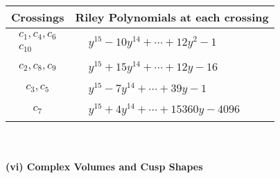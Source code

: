 \documentclass[1p]{elsarticle_modified}
\theoremstyle{definition}
\begin{document}
\begin{tabular}{m{50pt}|m{274pt}}
Crossings & \hspace{64pt}Riley Polynomials at each crossing \\
\hline $$\begin{aligned}c_{1},c_{4},c_{6}\\c_{10}\end{aligned}$$&$\begin{aligned}
&y^{15}-10 y^{14}+\cdots+12 y^2-1
\end{aligned}$\\
\hline $$\begin{aligned}c_{2},c_{8},c_{9}\end{aligned}$$&$\begin{aligned}
&y^{15}+15 y^{14}+\cdots+12 y-16
\end{aligned}$\\
\hline $$\begin{aligned}c_{3},c_{5}\end{aligned}$$&$\begin{aligned}
&y^{15}-7 y^{14}+\cdots+39 y-1
\end{aligned}$\\
\hline $$\begin{aligned}c_{7}\end{aligned}$$&$\begin{aligned}
&y^{15}+4 y^{14}+\cdots+15360 y-4096
\end{aligned}$\\
\hline
\end{tabular}\\~\\
\newpage\flushleft \textbf{(vi) Complex Volumes and Cusp Shapes}
\end{document}
